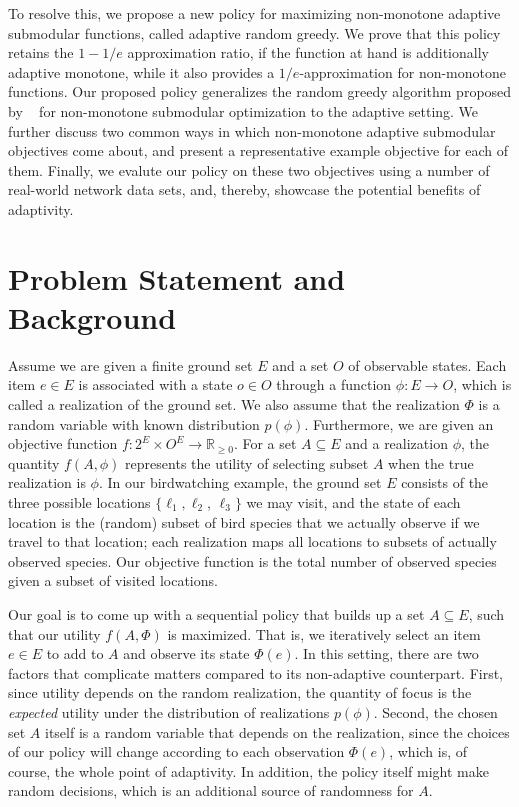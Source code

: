 \documentclass{article}
\newcommand{\citet}[1]{\citeauthor{#1}~\shortcite{#1}}
\begin{document}
To resolve this, we propose a new policy for maximizing non-monotone adaptive submodular functions, called adaptive random greedy.
We prove that this policy retains the $1-1/e$ approximation ratio, if the function at hand is additionally adaptive monotone, while it also provides a $1/e$-approximation for non-monotone functions.
Our proposed policy generalizes the random greedy algorithm proposed by \citet{buchbinder14} for non-monotone submodular optimization to the adaptive setting.
We further discuss two common ways in which non-monotone adaptive submodular objectives come about, and present a representative example objective for each of them.
Finally, we evalute our policy on these two objectives using a number of real-world network data sets, and, thereby, showcase the potential benefits of adaptivity.

\section{Problem Statement and Background}
Assume we are given a finite ground set $E$ and a set $O$ of observable states.
Each item $e \in E$ is associated with a state $o \in O$ through a function $\phi : E \to O$, which is called a realization of the ground set.
We also assume that the realization $\Phi$ is a random variable with known distribution $p(\phi)$.
Furthermore, we are given an objective function $f : 2^E \times O^E \to \mathbb{R}_{\geq 0}$.
For a set $A \subseteq E$ and a realization $\phi$, the quantity $f(A, \phi)$ represents the utility of selecting subset $A$ when the true realization is $\phi$.
In our birdwatching example, the ground set $E$ consists of the three possible locations $\{\ell_1, \ell_2$, $\ell_3\}$ we may visit, and the state of each location is the (random) subset of bird species that we actually observe if we travel to that location; each realization maps all locations to subsets of actually observed species.
Our objective function is the total number of observed species given a subset of visited locations.

Our goal is to come up with a sequential policy that builds up a set $A \subseteq E$, such that our utility $f(A, \Phi)$ is maximized.
That is, we iteratively select an item $e \in E$ to add to $A$ and observe its state $\Phi(e)$.
In this setting, there are two factors that complicate matters compared to its non-adaptive counterpart.
First, since utility depends on the random realization, the quantity of focus is the \emph{expected} utility under the distribution of realizations $p(\phi)$.
Second, the chosen set $A$ itself is a random variable that depends on the realization, since the choices of our policy will change according to each observation $\Phi(e)$, which is, of course, the whole point of adaptivity.
In addition, the policy itself might make random decisions, which is an additional source of randomness for $A$.
\end{document}
